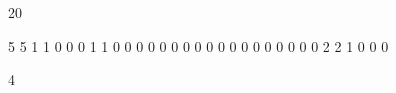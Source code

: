 \begin{myverbbox}[\small]{\voutput}
    20
\end{myverbbox}


\begin{myverbbox}[\small]{\vinput}
    5 5
    1 1 0 0 0
    1 1 0 0 0
    0 0 0 0 0
    0 0 0 0 0
    0 0 0 0 0
    2 2
    1 0
    0 0
\end{myverbbox}

\begin{myverbbox}[\small]{\voutput}
    4
\end{myverbbox}

